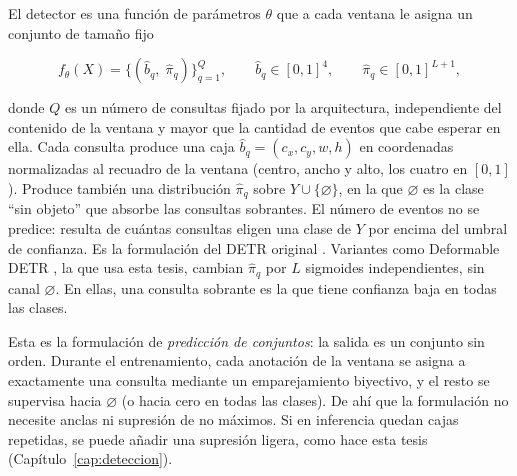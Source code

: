 El detector es una función de parámetros $\theta$ que a cada ventana le asigna un
conjunto de tamaño fijo

\begin{equation}
    f_\theta(X) = \bigl\{(\hat{b}_q,\; \hat{\pi}_q)\bigr\}_{q=1}^{Q},
    \qquad
    \hat{b}_q \in [0, 1]^4,
    \qquad
    \hat{\pi}_q \in [0, 1]^{L+1},
    \label{eq:modelo}
\end{equation}

donde $Q$ es un número de consultas fijado por la arquitectura, independiente del
contenido de la ventana y mayor que la cantidad de eventos que cabe esperar en
ella. Cada consulta produce una caja $\hat{b}_q = (c_x, c_y, w, h)$ en
coordenadas normalizadas al recuadro de la ventana (centro, ancho y alto, los
cuatro en $[0, 1]$). Produce también una distribución $\hat{\pi}_q$ sobre
$Y \cup \{\varnothing\}$, en la que $\varnothing$ es la clase ``sin objeto'' que
absorbe las consultas sobrantes. El número de eventos no se predice: resulta de
cuántas consultas eligen una clase de $Y$ por encima del umbral de confianza. Es la
formulación del DETR original \citep{carion_detr_2020}. Variantes como Deformable
DETR \citep{zhu_deformable_2021}, la que usa esta tesis, cambian $\hat{\pi}_q$ por
$L$ sigmoides independientes, sin canal $\varnothing$. En ellas, una consulta
sobrante es la que tiene confianza baja en todas las clases.

Esta es la formulación de \emph{predicción de conjuntos}: la salida es un conjunto
sin orden. Durante el entrenamiento, cada anotación de la ventana se asigna a
exactamente una consulta mediante un emparejamiento biyectivo, y el resto se
supervisa hacia $\varnothing$ (o hacia cero en todas las clases). De ahí que la
formulación no necesite anclas ni supresión de no máximos. Si en inferencia quedan
cajas repetidas, se puede añadir una supresión ligera, como hace esta tesis
(Capítulo~\ref{cap:deteccion}).


